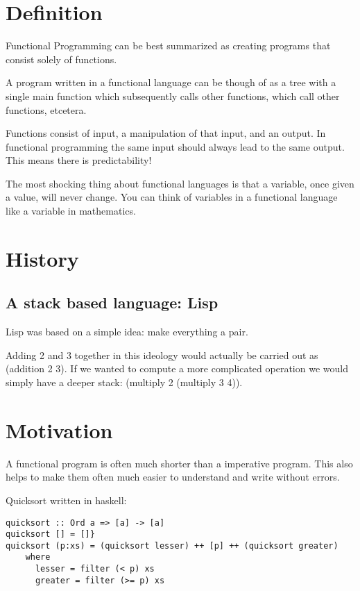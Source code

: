 \documentclass[presentation.tex]{subfiles}
\begin{document}
\large
\section{Definition}
Functional Programming can be best summarized as creating programs that consist solely of functions.

\vspace{\baselineskip}
A program written in a functional language can be though of as a tree with a single main function which subsequently calls other functions, which call other functions, etcetera.

\vspace{\baselineskip}
Functions consist of input, a manipulation of that input, and an output. In functional programming the same input should always lead to the same output. This means there is predictability!

\vspace{\baselineskip}
The most shocking thing about functional languages is that a variable, once given a value, will never change. You can think of variables in a functional language like a variable in mathematics. %


\pagebreak
\section{History}
\subsection{A stack based language: Lisp}
Lisp was based on a simple idea: make everything a pair.

\vspace{\baselineskip}
Adding 2 and 3 together in this ideology would actually be carried out as (addition 2 3). If we wanted to compute a more complicated operation we would simply have a deeper stack: (multiply 2 (multiply 3 4)).

\pagebreak
\section{Motivation}
A functional program is often much shorter than a imperative program. This also helps to make them often much easier to understand and write without errors.

\vspace{\baselineskip}
Quicksort written in haskell:
\scriptsize
\begin{verbatim}
quicksort :: Ord a => [a] -> [a]
quicksort [] = []}
quicksort (p:xs) = (quicksort lesser) ++ [p] ++ (quicksort greater)
    where
      lesser = filter (< p) xs
      greater = filter (>= p) xs
\end{verbatim}
\large
\end{document}

